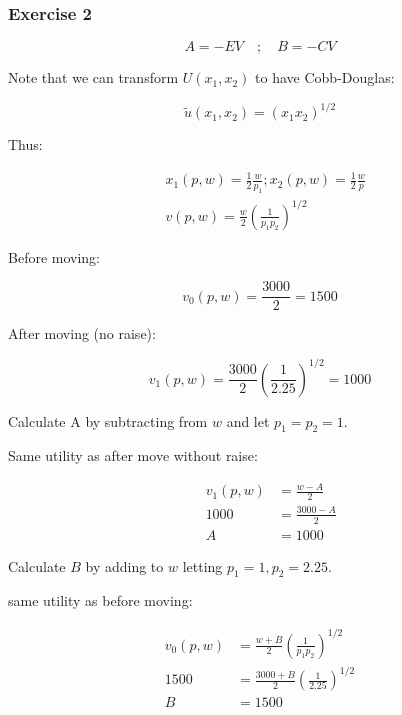 {
\subsubsection*{Exercise 2}

$$
A=-E V\quad ; \quad B=-C V
$$

Note that we can transform $U\left(x_{1}, x_{2}\right)$ to have Cobb-Douglas:

$$
\tilde{u}\left(x_{1}, x_{2}\right)=\left(x_{1} x_{2}\right)^{1 / 2}
$$

Thus:

$$
\begin{aligned}
& x_{1}(p, w)=\frac{1}{2} \frac{w}{p_{1}} ; x_{2}(p, w)=\frac{1}{2} \frac{w}{p} \\
& v(p, w)=\frac{w}{2}\left(\frac{1}{p_{1} p_{2}}\right)^{1 / 2}
\end{aligned}
$$

Before moving:

$$
v_{0}(p, w)=\frac{3000}{2}=1500
$$

After moving (no raise):

$$
v_{1}(p, w)=\frac{3000}{2}\left(\frac{1}{2.25}\right)^{1 / 2}=1000
$$

Calculate A by subtracting from $w$ and let $p_{1}=p_{2}=1$.

Same utility as after move without raise:

$$
\begin{aligned}
& & v_{1}(p, w) & =\frac{w-A}{2} \\
& & 1000 & =\frac{3000-A}{2} \\
& & A & =1000
\end{aligned}
$$

Calculate $B$ by adding to $w$ letting $p_{1}=1, p_{2}=2.25$.

same utility as before moving:

$$
\begin{aligned}
v_{0}(p, w) & =\frac{w+B}{2}\left(\frac{1}{p_{1} p_{2}}\right)^{1 / 2} \\
1500 & =\frac{3000+B}{2}\left(\frac{1}{2.25}\right)^{1 / 2} \\
B & =1500
\end{aligned}
$$
}
